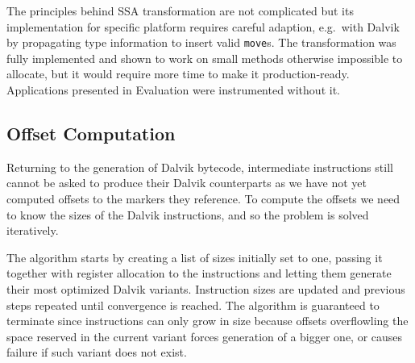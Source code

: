 \documentclass[12pt,twoside,notitlepage]{report}
\begin{document}
The principles behind SSA transformation are not complicated but its implementation for specific platform requires careful adaption, e.g.\ with Dalvik by propagating type information to insert valid \texttt{move}s. The transformation was fully implemented and shown to work on small methods otherwise impossible to allocate, but it would require more time to make it production-ready. Applications presented in Evaluation were instrumented without it.

\subsection{Offset Computation}

Returning to the generation of Dalvik bytecode, intermediate instructions still cannot be asked to produce their Dalvik counterparts as we have not yet computed offsets to the markers they reference. To compute the offsets we need to know the sizes of the Dalvik instructions, and so the problem is solved iteratively.

The algorithm starts by creating a list of sizes initially set to one, passing it together with register allocation to the instructions and letting them generate their most optimized Dalvik variants. Instruction sizes are updated and previous steps repeated until convergence is reached. The algorithm is guaranteed to terminate since instructions can only grow in size because offsets overflowling the space reserved in the current variant forces generation of a bigger one, or causes failure if such variant does not exist.
\end{document}
